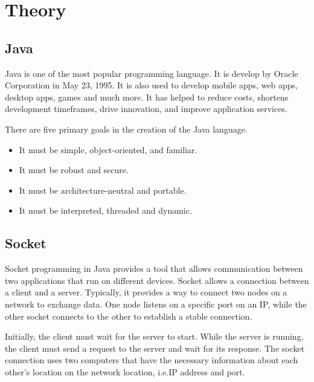 \chapter{Theory}\label{ch:theory}
\section{Java}\label{sec:java}
    Java is one of the most popular programming language.
    It is develop by Oracle Corporation in May 23, 1995.
    It is also used to develop mobile apps, web apps, desktop apps, games and much more.
    It has helped to reduce costs, shortens development timeframes, drive innovation,
    and improve application services.
    \medskip

    \noindent
    There are five primary goals in the creation of the Java language.
    \begin{itemize}
        \item It must be simple, object-oriented, and familiar.
        \item It must be robust and secure.
        \item It must be architecture-neutral and portable.
        \item It must be interpreted, threaded and dynamic.
    \end{itemize}

    \section{Socket}\label{sec:socket}
    Socket programming in Java provides a tool that allows communication between two applications
    that run on different devices.
    Socket allows a connection between a client and a server.
    Typically, it provides a way to connect two nodes on a network to exchange data.
    One node listens on a specific port on an IP, while the other socket connects to the other to
    establish a stable connection.
    \medskip

    \noindent
    Initially, the client must wait for the server to start.
    While the server is running, the client must send a request to the server and wait for its
    response.
    The socket connection uses two computers that have the necessary information about each
    other's location on the network location, i.e.IP address and port.
    \medskip

